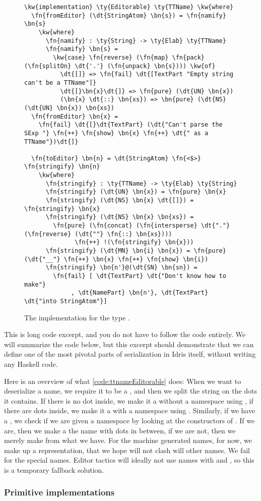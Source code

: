 \begin{figure}[ht]
\caption{The  implementation for the type .}
\label{code:ttnameEditorable}
\begin{Verbatim}[framesep=2mm, label=\footnotesize{\normalfont{Idris}}, labelposition=topline]
\kw{implementation} \ty{Editorable} \ty{TTName} \kw{where}
  \fn{fromEditor} (\dt{StringAtom} \bn{s}) = \fn{namify} \bn{s}
    \kw{where}
      \fn{namify} : \ty{String} -> \ty{Elab} \ty{TTName}
      \fn{namify} \bn{s} =
        \kw{case} \fn{reverse} (\fn{map} \fn{pack} (\fn{splitOn} \dt{'.'} (\fn{unpack} \bn{s}))) \kw{of}
          \dt{[]} => \fn{fail} \dt{[TextPart "Empty string can't be a TTName"]}
          \dt{[}\bn{x}\dt{]} => \fn{pure} (\dt{UN} \bn{x})
          (\bn{x} \dt{::} \bn{xs}) => \bn{pure} (\dt{NS} (\dt{UN} \bn{x}) \bn{xs})
  \fn{fromEditor} \bn{x} =
    \fn{fail} \dt{[}\dt{TextPart} (\dt{"Can't parse the SExp "} \fn{++} \fn{show} \bn{x} \fn{++} \dt{" as a TTName"})\dt{]}

  \fn{toEditor} \bn{n} = \dt{StringAtom} \fn{<$>} \fn{stringify} \bn{n}
    \kw{where}
      \fn{stringify} : \ty{TTName} -> \ty{Elab} \ty{String}
      \fn{stringify} (\dt{UN} \bn{x}) = \fn{pure} \bn{x}
      \fn{stringify} (\dt{NS} \bn{x} \dt{[]}) = \fn{stringify} \bn{x}
      \fn{stringify} (\dt{NS} \bn{x} \bn{xs}) =
        \fn{pure} (\fn{concat} (\fn{intersperse} \dt{"."} (\fn{reverse} (\dt{""} \fn{::} \bn{xs})))
              \fn{++} !(\fn{stringify} \bn{x}))
      \fn{stringify} (\dt{MN} \bn{i} \bn{x}) = \fn{pure} (\dt{"__"} \fn{++} \bn{x} \fn{++} \fn{show} \bn{i})
      \fn{stringify} \bn{n'}@(\dt{SN} \bn{sn}) =
        \fn{fail} [ \dt{TextPart} \dt{"Don't know how to make"}
             , \dt{NamePart} \bn{n'}, \dt{TextPart} \dt{"into StringAtom"}]
\end{Verbatim}
\end{figure}

This is long code excerpt, and you do not have to follow the code entirely.
We will summarize the code below, but this excerpt should demonstrate that
we can define one of the most pivotal parts of serialization in Idris itself,
without writing any Haskell code.

Here is an overview of what \autoref{code:ttnameEditorable} does: When we want
to deserialize a name, we require it to be a , and then we split
the string  on the dots it contains. If there is no dot inside, we make
it a  without a namespace using , if there are dots inside,
we make it a  with a namespace using . Similarly, if we have
a , we check if we are given a namespace by looking at the
constructors of . If we are, then we make a  the name
with dots in between, if we are not, then we merely make  from what
we have.
For the machine generated names, for now, we make up a representation, that we
hope will not clash will other names.
We fail for the special names. Editor tactics will ideally not use names with
 and , so this is a temporary fallback solution.

\subsubsection{Primitive  implementations}


